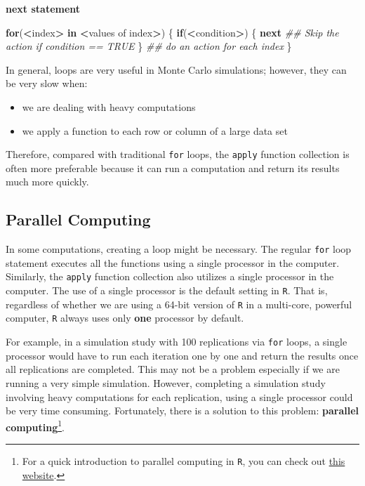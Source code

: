 \documentclass[
]{book}
\newenvironment{Shaded}{\begin{snugshade}}{\end{snugshade}}
\newcommand{\CommentTok}[1]{\textcolor[rgb]{0.56,0.35,0.01}{\textit{#1}}}
\newcommand{\ControlFlowTok}[1]{\textcolor[rgb]{0.13,0.29,0.53}{\textbf{#1}}}
\newcommand{\NormalTok}[1]{#1}
\newcommand{\OperatorTok}[1]{\textcolor[rgb]{0.81,0.36,0.00}{\textbf{#1}}}
\newcommand{\StringTok}[1]{\textcolor[rgb]{0.31,0.60,0.02}{#1}}
\providecommand{\tightlist}{%
  \setlength{\itemsep}{0pt}\setlength{\parskip}{0pt}}
\begin{document}
\textbf{next statement}

\begin{Shaded}
\begin{Highlighting}[]
\ControlFlowTok{for}\NormalTok{(}\OperatorTok{<}\NormalTok{index}\OperatorTok{>}\StringTok{ }\ControlFlowTok{in} \OperatorTok{<}\NormalTok{values of index}\OperatorTok{>}\NormalTok{) \{}
  \ControlFlowTok{if}\NormalTok{(}\OperatorTok{<}\NormalTok{condition}\OperatorTok{>}\NormalTok{) \{}
    \ControlFlowTok{next} \CommentTok{## Skip the action if condition == TRUE}
\NormalTok{  \}}
  \CommentTok{## do an action for each index}
\NormalTok{\}}
\end{Highlighting}
\end{Shaded}

In general, loops are very useful in Monte Carlo simulations; however, they can be very slow when:

\begin{itemize}
\tightlist
\item
  we are dealing with heavy computations
\item
  we apply a function to each row or column of a large data set
\end{itemize}

Therefore, compared with traditional \texttt{for} loops, the \texttt{apply} function collection is often more preferable because it can run a computation and return its results much more quickly.

\hypertarget{parallel-computing}{%
\subsection{Parallel Computing}\label{parallel-computing}}

In some computations, creating a loop might be necessary. The regular \texttt{for} loop statement executes all the functions using a single processor in the computer. Similarly, the \texttt{apply} function collection also utilizes a single processor in the computer. The use of a single processor is the default setting in \texttt{R}. That is, regardless of whether we are using a 64-bit version of \texttt{R} in a multi-core, powerful computer, \texttt{R} always uses only \textbf{one} processor by default.

For example, in a simulation study with 100 replications via \texttt{for} loops, a single processor would have to run each iteration one by one and return the results once all replications are completed. This may not be a problem especially if we are running a very simple simulation. However, completing a simulation study involving heavy computations for each replication, using a single processor could be very time consuming. Fortunately, there is a solution to this problem: \textbf{parallel computing}\footnote{For a quick introduction to parallel computing in \texttt{R}, you can check out \href{https://nceas.github.io/oss-lessons/parallel-computing-in-r/parallel-computing-in-r.html}{this website}.}.
\end{document}
